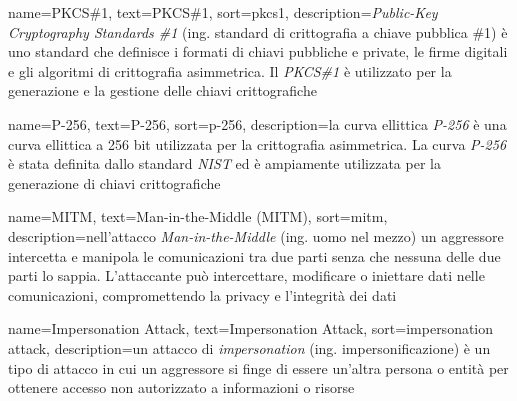  {
    name=PKCS\#1,
    text=PKCS\#1,
    sort=pkcs1,
    description={\emph{Public-Key Cryptography Standards \#1} (ing. standard di crittografia a chiave pubblica \#1) è uno standard che definisce i formati di chiavi pubbliche e private, le firme digitali e gli algoritmi di crittografia asimmetrica. Il \emph{PKCS\#1} è utilizzato per la generazione e la gestione delle chiavi crittografiche}
}

 {
    name=P-256,
    text=P-256,
    sort=p-256,
    description={la curva ellittica \emph{P-256} è una curva ellittica a 256 bit utilizzata per la crittografia asimmetrica. La curva \emph{P-256} è stata definita dallo standard \emph{NIST} ed è ampiamente utilizzata per la generazione di chiavi crittografiche}
}

 {
    name=MITM,
    text=Man-in-the-Middle (MITM),
    sort=mitm,
    description={nell'attacco \emph{Man-in-the-Middle} (ing. uomo nel mezzo) un aggressore intercetta e manipola le comunicazioni tra due parti senza che nessuna delle due parti lo sappia. L'attaccante può intercettare, modificare o iniettare dati nelle comunicazioni, compromettendo la privacy e l'integrità dei dati}
}

 {
    name=Impersonation Attack,
    text=Impersonation Attack,
    sort=impersonation attack,
    description={un attacco di \emph{impersonation} (ing. impersonificazione) è un tipo di attacco in cui un aggressore si finge di essere un'altra persona o entità per ottenere accesso non autorizzato a informazioni o risorse}
}